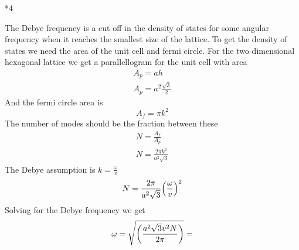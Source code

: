 \documentclass[a4paper]{article}
\begin{document}
\begin{section}
\begin{section}*{4}
	
The Debye frequency is a cut off in the density of states for some angular frequency when it reaches the smallest size of the lattice.
To get the density of states we need the area of the unit cell and fermi circle.
For the two dimensional hexagonal lattice we get a parallellogram for the unit cell with area
	\begin{align*}
		A_p = a h\\
		A_p = a^2\frac{\sqrt{3}}{2}
	\end{align*}
And the fermi circle area is
$$A_f = \pi k^2$$
The number of modes should be the fraction between these
	\begin{align*}
		N = \frac{A_f}{A_p}\\
		N = \frac{2\pi k^2}{a^2\sqrt{3}}
	\end{align*}
The Debye assumption is $k=\frac{\omega}{v}$
	$$N = \frac{2\pi}{a^2\sqrt{3}}\qty(\frac{\omega}{v})^2 $$
	Solving for the Debye frequency we get
	\begin{align*}
		\omega = \sqrt{\qty(\frac{a^2\sqrt{3}v^2N}{2\pi})} = 
	\end{align*}

\end{section}


\end{section}
\end{document}
